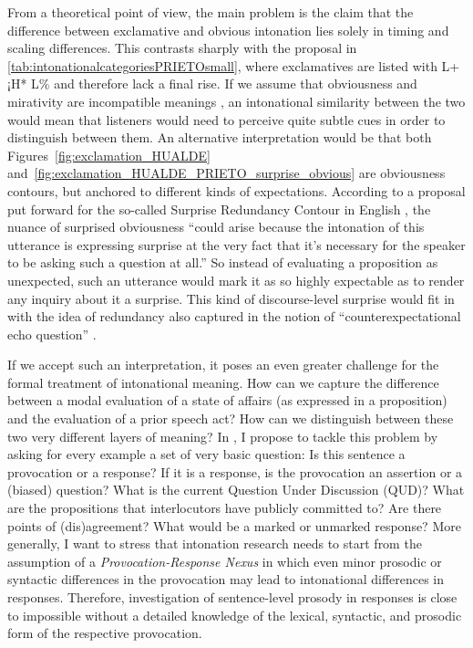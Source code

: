 From a theoretical point of view, the main problem is the claim that the difference between exclamative and obvious intonation lies solely in timing and scaling differences.
This contrasts sharply with the proposal in \autoref{tab:intonationalcategoriesPRIETOsmall}, where exclamatives are listed with L+¡H* L\% and therefore lack a final rise. If we assume that obviousness and mirativity are incompatible meanings \citep{Reich.2018}, an intonational similarity between the two would mean that listeners would need to perceive quite subtle cues in order to distinguish between them. An alternative interpretation would be that both Figures~\ref{fig:exclamation_HUALDE} and~\ref{fig:exclamation_HUALDE_PRIETO_surprise_obvious} are obviousness contours, but anchored to different kinds of expectations. According to a proposal put forward for the so-called Surprise Redundancy Contour in English \citep[497]{SagLiberman.1975}, the nuance of surprised obviousness ``could arise because the intonation of this utterance is expressing surprise at the very fact that it's necessary for the speaker to be asking such a question at all.'' So instead of evaluating a proposition as unexpected, such an utterance would mark it as so highly expectable as to render any inquiry about it a surprise. This kind of discourse-level surprise would fit in with the idea of redundancy also captured in the notion of ``counterexpectational echo question'' \citep[379]{HualdePrieto2015}.

If we accept such an interpretation, it poses an even greater challenge for the formal treatment of intonational meaning. How can we capture the difference between a modal evaluation of a state of affairs (as expressed in a proposition) and the evaluation of a prior speech act? How can we distinguish between these two very different layers of meaning? In , I propose to tackle this problem by asking for every example a set of very basic question: Is this sentence a provocation or a response? If it is a response, is the provocation an assertion or a (biased) question? What is the current Question Under Discussion (QUD)? What are the propositions that interlocutors have publicly committed to? Are there points of (dis)agreement? What would be a marked or unmarked response? More generally, I want to stress that intonation research needs to start from the assumption of a \textit{Provocation-Response Nexus} in which even minor prosodic or syntactic differences in the provocation may lead to intonational differences in responses. Therefore, investigation of sentence-level prosody in responses is close to impossible without a detailed knowledge of the lexical, syntactic, and prosodic form of the respective provocation.

